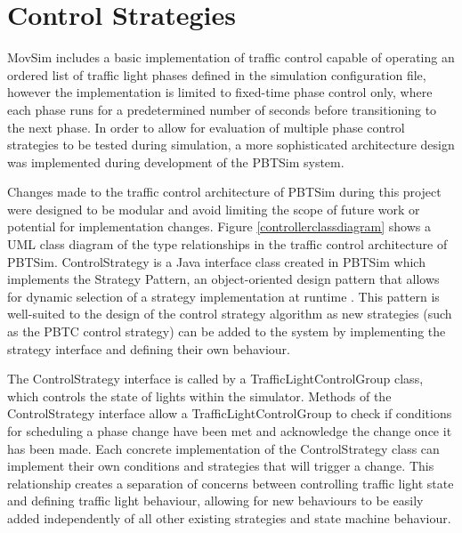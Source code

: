 
\section{Control Strategies}

MovSim includes a basic implementation of traffic control capable of operating an ordered list of traffic light phases defined in the simulation configuration file, however the implementation is limited to fixed-time phase control only, where each phase runs for a predetermined number of seconds before transitioning to the next phase. In order to allow for evaluation of multiple phase control strategies to be tested during simulation, a more sophisticated architecture design was implemented during development of the PBTSim system. 

Changes made to the traffic control architecture of PBTSim during this project were designed to be modular and avoid limiting the scope of future work or potential for implementation changes. Figure \ref{controllerclassdiagram} shows a UML class diagram of the type relationships in the traffic control architecture of PBTSim. ControlStrategy is a Java interface class created in PBTSim which implements the Strategy Pattern, an object-oriented design pattern that allows for dynamic selection of a strategy implementation at runtime \cite{gangof4}. This pattern is well-suited to the design of the control strategy algorithm as new strategies (such as the PBTC control strategy) can be added to the system by implementing the strategy interface and defining their own behaviour. 

The ControlStrategy interface is called by a TrafficLightControlGroup class, which controls the state of lights within the simulator. Methods of the ControlStrategy interface allow a TrafficLightControlGroup to check if conditions for scheduling a phase change have been met and acknowledge the change once it has been made. Each concrete implementation of the ControlStrategy class can implement their own conditions and strategies that will trigger a change. This relationship creates a separation of concerns between controlling traffic light state and defining traffic light behaviour, allowing for new behaviours to be easily added independently of all other existing strategies and state machine behaviour.

